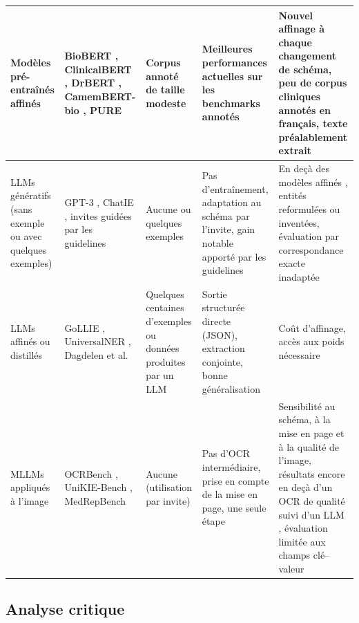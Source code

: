 {\begin{longtable}{|>{\raggedright\arraybackslash}p{2.1cm}|>{\raggedright\arraybackslash}p{2.4cm}|>{\raggedright\arraybackslash}p{2.2cm}|>{\raggedright\arraybackslash}p{3.0cm}|>{\raggedright\arraybackslash}p{3.4cm}|}
Modèles pré-entraînés affinés &
BioBERT \cite{lee2020biobert}, ClinicalBERT \cite{alsentzer2019clinicalbert}, DrBERT \cite{labrak2023drbert}, CamemBERT-bio \cite{touchent2024camembertbio}, PURE \cite{zhong2021frustratingly} &
Corpus annoté de taille modeste &
Meilleures performances actuelles sur les benchmarks annotés \cite{chen2025benchmarking, henry2020n2c2} &
Nouvel affinage à chaque changement de schéma, peu de corpus cliniques annotés en français, texte préalablement extrait \\
\hline

LLMs génératifs (sans exemple ou avec quelques exemples) &
GPT-3 \cite{agrawal2022fewshot}, ChatIE \cite{wei2023chatie}, invites guidées par les guidelines \cite{hu2024clinicalner} &
Aucune ou quelques exemples &
Pas d'entraînement, adaptation au schéma par l'invite, gain notable apporté par les guidelines \cite{hu2024clinicalner, sainz2024gollie} &
En deçà des modèles affinés \cite{gutierrez2022gpt3bioie, chen2025benchmarking}, entités reformulées ou inventées, évaluation par correspondance exacte inadaptée \cite{wadhwa2023revisiting} \\
\hline

LLMs affinés ou distillés &
GoLLIE \cite{sainz2024gollie}, UniversalNER \cite{zhou2024universalner}, Dagdelen et al. \cite{dagdelen2024structured} &
Quelques centaines d'exemples ou données produites par un LLM &
Sortie structurée directe (JSON), extraction conjointe, bonne généralisation &
Coût d'affinage, accès aux poids nécessaire \\
\hline

MLLMs appliqués à l'image &
OCRBench \cite{liu2024ocrbench}, UniKIE-Bench \cite{ji2026unikie}, MedRepBench \cite{shang2025medrepbench} &
Aucune (utilisation par invite) &
Pas d'OCR intermédiaire, prise en compte de la mise en page, une seule étape &
Sensibilité au schéma, à la mise en page et à la qualité de l'image, résultats encore en deçà d'un OCR de qualité suivi d'un LLM \cite{shang2025medrepbench}, évaluation limitée aux champs clé--valeur \\
\end{longtable}
}

\subsection{Analyse critique}

